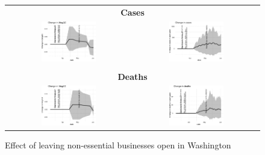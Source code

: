 \documentclass[11pt,reqno,letter]{amsart}
\theoremstyle{definition}
\begin{document}
\begin{figure}[ht]
  \caption{Effect of leaving non-essential businesses open in Washington \label{fig:WA-nb}}
  \begin{minipage}{\linewidth}
    \centering
    \begin{tabular}{cc}
      \multicolumn{2}{c}{\textbf{Cases}} \\
      \includegraphics[width=0.45\textwidth]{tables_and_figures/Washington-nb-dgrowth_v1}
      &
        \includegraphics[width=0.45\textwidth]{tables_and_figures/Washington-nb-dcases_v1}\\
      \\
      \multicolumn{2}{c}{\textbf{Deaths}} \\
      \includegraphics[width=0.45\textwidth]{tables_and_figures/Washington-nb-dgrowth_deaths_v1}
      & \includegraphics[width=0.45\textwidth]{tables_and_figures/Washington-nb-dcases_deaths_v1}
    \end{tabular}
  \end{minipage}
\end{figure}
\end{document}
